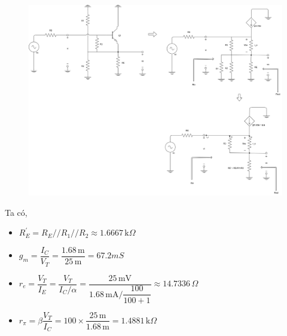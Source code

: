 \begin{figure}[H]
	\centering
	\includegraphics[width=.9\linewidth]{./my-chapters/my-diagrams/Question4/caub_t.png}
\end{figure}

Ta có, 

\begin{itemize}[label=+, leftmargin=2cm]
	\item $R_{E}^{'} = R_{E} // R_{1} // R_{2} \approx 1.6667\,\text{k}\Omega$
	\item $g_{m} = \dfrac{I_{C}}{V_{T}} =  \dfrac{1.68\,\text{m}}{25\,\text{m}} = 67.2mS$
	\item $r_{e} = \dfrac{V_{T}}{I_{E}} = \dfrac{V_{T}}{I_{C}/\alpha} = \dfrac{25\,\text{mV}}{1.68\,\text{mA} / \dfrac{100}{100+1}} \approx 14.7336\,\Omega$
	\item $r_{\pi} = \beta \dfrac{V_{T}}{I_{C}} = 100\times\dfrac{25\,\text{m}}{1.68\,\text{m}} = 1.4881\,\text{k}\Omega$
\end{itemize}

